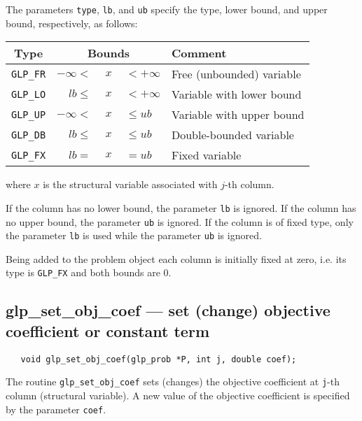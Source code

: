 The parameters \verb|type|, \verb|lb|, and \verb|ub| specify the type,
lower bound, and upper bound, respectively, as follows:

\begin{center}
\begin{tabular}{cr@{}c@{}ll}
Type & \multicolumn{3}{c}{Bounds} & Comment \\
\hline
\verb|GLP_FR| & $-\infty <$ &$\ x\ $& $< +\infty$
   & Free (unbounded) variable \\
\verb|GLP_LO| & $lb \leq$ &$\ x\ $& $< +\infty$
   & Variable with lower bound \\
\verb|GLP_UP| & $-\infty <$ &$\ x\ $& $\leq ub$
   & Variable with upper bound \\
\verb|GLP_DB| & $lb \leq$ &$\ x\ $& $\leq ub$
   & Double-bounded variable \\
\verb|GLP_FX| & $lb =$ &$\ x\ $& $= ub$
   & Fixed variable \\
\end{tabular}
\end{center}

\noindent
where $x$ is the structural variable associated with $j$-th column.

If the column has no lower bound, the parameter \verb|lb| is ignored.
If the column has no upper bound, the parameter \verb|ub| is ignored.
If the column is of fixed type, only the parameter \verb|lb| is used
while the parameter \verb|ub| is ignored.

Being added to the problem object each column is initially fixed at
zero, i.e. its type is \verb|GLP_FX| and both bounds are 0.

\newpage

\subsection{glp\_set\_obj\_coef --- set (change) objective coefficient
or constant term}

\synopsis

\begin{verbatim}
   void glp_set_obj_coef(glp_prob *P, int j, double coef);
\end{verbatim}

\description

The routine \verb|glp_set_obj_coef| sets (changes) the objective
coefficient at \verb|j|-th column (structural variable). A new value of
the objective coefficient is specified by the parameter \verb|coef|.


